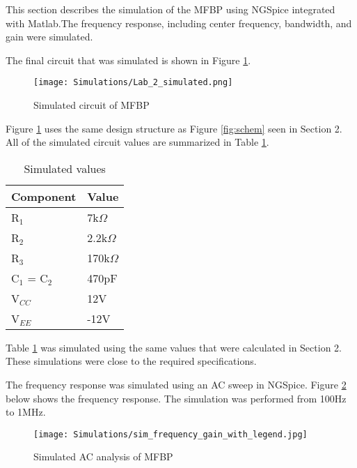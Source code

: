 



This section describes the simulation of the MFBP using NGSpice integrated with Matlab.The frequency response, including center frequency, bandwidth, and gain were simulated.

The final circuit that was simulated is shown in Figure \ref{fig:simcircuit}. 
\begin{figure}[H]
    \centering
    \texttt{[image: Simulations/Lab\_2\_simulated.png]}
    \caption{Simulated circuit of MFBP}
    \label{fig:simcircuit}
\end{figure}

\noindent Figure \ref{fig:simcircuit} uses the same design structure as Figure \ref{fig:schem} seen in Section 2. 
All of the simulated circuit values are summarized in Table \ref{tab:simcomp}.


\begin{table}[H]
\centering
\caption{Simulated values}
\label{tab:simcomp}
\begin{tabular}{|l|l|}
\hline
Component     & Value        \\ \hline
R$_1$         & 7k$\Omega$   \\ \hline
R$_2$         & 2.2k$\Omega$ \\ \hline
R$_3$         & 170k$\Omega$ \\ \hline
C$_1$ = C$_2$ & 470pF        \\ \hline
V$_{CC}$        & 12V          \\ \hline
V$_{EE}$        & -12V         \\ \hline
\end{tabular}
\end{table}

Table \ref{tab:simcomp} was simulated using the same values that were calculated in Section 2. These simulations were close to the required specifications.
\newline 



The frequency response was simulated using an AC sweep in NGSpice. Figure \ref{fig:sim_freqresp} below shows the frequency response. The simulation was performed from 100Hz to 1MHz.
\begin{figure}[H]
    \centering
    \texttt{[image: Simulations/sim\_frequency\_gain\_with\_legend.jpg]}
    \caption{Simulated AC analysis of MFBP}
    \label{fig:sim_freqresp}
\end{figure}

